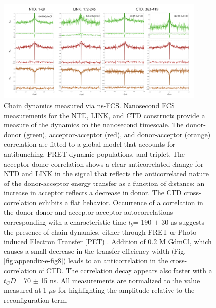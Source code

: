 \documentclass[../main.tex]{subfiles}
\begin{document}
        \begin{figure}[!htb] %
            \centering
            \includegraphics[width=4in]{appendix-e-fig11.png}
            \caption[Chain dynamics measured via ns-FCS.]
                {Chain dynamics measured via ns-FCS. Nanosecond FCS measurements for the NTD, LINK, and CTD constructs provide a measure of the dynamics on the nanosecond timescale. The donor-donor (green), acceptor-acceptor (red), and donor-acceptor (orange) correlation are fitted to a global model that accounts for antibunching, FRET dynamic populations, and triplet. The acceptor-donor correlation shows a clear anticorrelated change for NTD and LINK in the signal that reflects the anticorrelated nature of the donor-acceptor energy transfer as a function of distance: an increase in acceptor reflects a decrease in donor. The CTD cross-correlation exhibits a flat behavior. Occurrence of a correlation in the donor-donor and acceptor-acceptor autocorrelations corresponding with a characteristic time $t_b$= 190 $\pm$ 30 ns suggests the presence of chain dynamics, either through FRET or Photo-induced Electron Transfer (PET) \cite{Sauer2014-ux,Haenni2013-xz}. Addition of 0.2 M GdmCl, which causes a small decrease in the transfer efficiency width (Fig. \ref{fig:appendix-e-fig8}) leads to an anticorrelation in the cross-correlation of CTD. The correlation decay appears also faster with a $t_CD$= 70 $\pm$ 15 ns. All measurements are normalized to the value measured at 1 $\mu$s for highlighting the amplitude relative to the reconfiguration term.}
            \label{fig:appendix-e-fig11}
        \end{figure}
\end{document}
